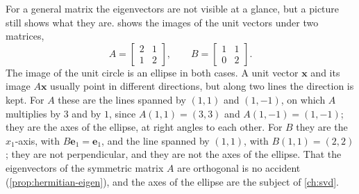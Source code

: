 For a general matrix the eigenvectors are not visible at a glance, but a picture still shows what they are.  shows the images of the unit vectors under two matrices,
\begin{equation}
A=\begin{bmatrix}2&1\\1&2\end{bmatrix},\qquad B=\begin{bmatrix}1&1\\0&2\end{bmatrix}.
\label{eq:two-by-two-examples}
\end{equation}
The image of the unit circle is an ellipse in both cases. A unit vector $\mathbf x$ and its image $A\mathbf x$ usually point in different directions, but along two lines the direction is kept. For $A$ these are the lines spanned by $(1,1)$ and $(1,-1)$, on which $A$ multiplies by $3$ and by $1$, since $A(1,1)=(3,3)$ and $A(1,-1)=(1,-1)$; they are the axes of the ellipse, at right angles to each other. For $B$ they are the $x_1$-axis, with $B\mathbf e_1=\mathbf e_1$, and the line spanned by $(1,1)$, with $B(1,1)=(2,2)$; they are not perpendicular, and they are not the axes of the ellipse. That the eigenvectors of the symmetric matrix $A$ are orthogonal is no accident (\cref{prop:hermitian-eigen}), and the axes of the ellipse are the subject of \cref{ch:svd}.


